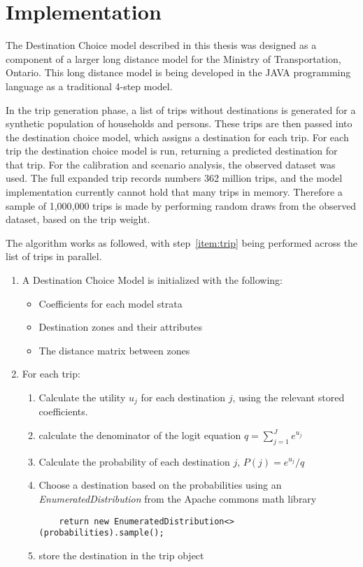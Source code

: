 \section{Implementation}
\label{section:implementation}
The Destination Choice model described in this thesis was designed as a component of a larger long distance model for the Ministry of Transportation, Ontario. This long distance model is being developed in the JAVA programming language as a traditional 4-step model. 

In the trip generation phase, a list of trips without destinations is generated for a synthetic population of households and persons. These trips are then passed into the destination choice model, which assigns a destination for each trip. For each trip the destination choice model is run, returning a predicted destination for that trip. For the calibration and scenario analysis, the observed dataset was used. The full expanded trip records numbers 362 million trips, and the model implementation currently cannot hold that many trips in memory. Therefore a sample of 1,000,000 trips is made by performing random draws from the observed dataset, based on the trip weight.

The algorithm works as followed, with step~\ref{item:trip} being performed across the list of trips in parallel. 

\begin{enumerate}
\item A Destination Choice Model is initialized with the following:
	\begin{itemize}
	\item Coefficients for each model strata
	\item Destination zones and their attributes
	\item The distance matrix between zones
	\end{itemize}
\item \label{item:trip} For each trip:
	\begin{enumerate}
	\item Calculate the utility $u_j$ for each destination $j$, using the relevant stored coefficients.
	\item \label{item:denom} calculate the denominator of the logit equation $q = {\sum_{j=1}^{J} e^{u_j}}
	$
	\item Calculate the probability of each destination $j$, $P(j) = e^{u_j} / q $
	\item Choose a destination based on the probabilities using an \textit{EnumeratedDistribution} from the Apache commons math library 
	\begin{verbatim}
	return new EnumeratedDistribution<>(probabilities).sample();
	\end{verbatim}

	\item store the destination in the trip object
	\end{enumerate}
\end{enumerate}

